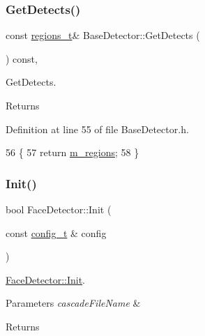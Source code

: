 \subsubsection{\texorpdfstring{Get\+Detects()}{GetDetects()}}
{\footnotesize\ttfamily const \mbox{\hyperlink{defines_8h_a01db0de56a20f4342820a093c5154536}{regions\+\_\+t}}\& Base\+Detector\+::\+Get\+Detects (\begin{DoxyParamCaption}{ }\end{DoxyParamCaption}) const\hspace{0.3cm}{\ttfamily [inline]}, {\ttfamily [inherited]}}



Get\+Detects. 

\begin{DoxyReturn}{Returns}

\end{DoxyReturn}


Definition at line 55 of file Base\+Detector.\+h.


\begin{DoxyCode}
56     \{
57         \textcolor{keywordflow}{return} \mbox{\hyperlink{class_base_detector_a409c20093acba261db8354ca72058fce}{m\_regions}};
58     \}
\end{DoxyCode}
\mbox{\label{class_face_detector_ad235988d85ae9c826269e21d5c3c1451}} 
\subsubsection{\texorpdfstring{Init()}{Init()}}
{\footnotesize\ttfamily bool Face\+Detector\+::\+Init (\begin{DoxyParamCaption}\item[{const \mbox{\hyperlink{defines_8h_a81d657237a541d02f8eeefdd40191920}{config\+\_\+t}} \&}]{config }\end{DoxyParamCaption})\hspace{0.3cm}{\ttfamily [virtual]}}



\mbox{\hyperlink{class_face_detector_ad235988d85ae9c826269e21d5c3c1451}{Face\+Detector\+::\+Init}}. 


\begin{DoxyParams}{Parameters}
{\em cascade\+File\+Name} & \\
\hline
\end{DoxyParams}
\begin{DoxyReturn}{Returns}

\end{DoxyReturn}


